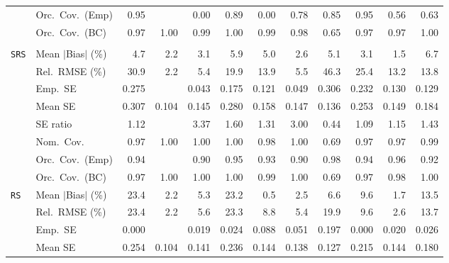 \begin{landscape}
\begin{longtable}{llrrrrrrrrrr}
 & Orc.\ Cov.\ (Emp) & \cellcolor{rankone}0.95 &  & 0.00 & \cellcolor{rankthree}0.89 & 0.00 & 0.78 & 0.85 & \cellcolor{ranktwo}0.95 & 0.56 & 0.63 \\
 & Orc.\ Cov.\ (BC) & \cellcolor{ranktwo}0.97 & 1.00 & 0.99 & 1.00 & 0.99 & 0.98 & 0.65 & \cellcolor{rankthree}0.97 & \cellcolor{rankone}0.97 & 1.00 \\
\addlinespace[2pt]
\multicolumn{12}{l}{\textbf{Binary \& Categorical Phase-One Covariates}} \\
\addlinespace[2pt]
\quad \texttt{SRS} & Mean $|$Bias$|$ (\%) & 4.7 & \cellcolor{ranktwo}2.2 & 3.1 & 5.9 & 5.0 & \cellcolor{rankthree}2.6 & 5.1 & 3.1 & \cellcolor{rankone}1.5 & 6.7 \\
 & Rel.\ RMSE (\%) & 30.9 & \cellcolor{rankone}2.2 & \cellcolor{ranktwo}5.4 & 19.9 & 13.9 & \cellcolor{rankthree}5.5 & 46.3 & 25.4 & 13.2 & 13.8 \\
 & Emp.\ SE & 0.275 &  & 0.043 & 0.175 & 0.121 & 0.049 & 0.306 & 0.232 & 0.130 & 0.129 \\
 & Mean SE & 0.307 & 0.104 & 0.145 & 0.280 & 0.158 & 0.147 & 0.136 & 0.253 & 0.149 & 0.184 \\
 & SE ratio & \cellcolor{ranktwo}1.12 &  & 3.37 & 1.60 & 1.31 & 3.00 & 0.44 & \cellcolor{rankone}1.09 & \cellcolor{rankthree}1.15 & 1.43 \\
 & Nom.\ Cov. & \cellcolor{rankone}0.97 & 1.00 & 1.00 & 1.00 & 0.98 & 1.00 & 0.69 & \cellcolor{ranktwo}0.97 & \cellcolor{rankthree}0.97 & 0.99 \\
 & Orc.\ Cov.\ (Emp) & \cellcolor{ranktwo}0.94 &  & 0.90 & \cellcolor{rankone}0.95 & 0.93 & 0.90 & 0.98 & \cellcolor{rankthree}0.94 & 0.96 & 0.92 \\
 & Orc.\ Cov.\ (BC) & \cellcolor{rankone}0.97 & 1.00 & 1.00 & 1.00 & 0.99 & 1.00 & 0.69 & \cellcolor{ranktwo}0.97 & \cellcolor{rankthree}0.98 & 1.00 \\
\addlinespace[2pt]
\quad \texttt{RS} & Mean $|$Bias$|$ (\%) & 23.4 & \cellcolor{rankthree}2.2 & 5.3 & 23.2 & \cellcolor{rankone}0.5 & 2.5 & 6.6 & 9.6 & \cellcolor{ranktwo}1.7 & 13.5 \\
 & Rel.\ RMSE (\%) & 23.4 & \cellcolor{rankone}2.2 & 5.6 & 23.3 & 8.8 & \cellcolor{rankthree}5.4 & 19.9 & 9.6 & \cellcolor{ranktwo}2.6 & 13.7 \\
 & Emp.\ SE & 0.000 &  & 0.019 & 0.024 & 0.088 & 0.051 & 0.197 & 0.000 & 0.020 & 0.026 \\
 & Mean SE & 0.254 & 0.104 & 0.141 & 0.236 & 0.144 & 0.138 & 0.127 & 0.215 & 0.144 & 0.180 \\

\end{longtable}
\end{landscape}

